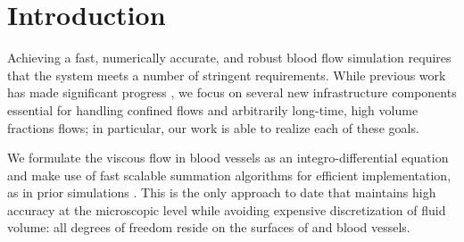 \section{Introduction\label{sec:intro}}
%
%
%

Achieving a fast, numerically accurate, and robust blood flow simulation requires that the system meets a number of stringent requirements.
While previous work has made significant progress \cite{Malhotra2017,lu2018parallel,rahimian2010petascale}, we focus on several new infrastructure components essential for handling confined flows and arbitrarily long-time, high volume fractions \rbc flows; in particular, our work is able to realize each of these goals.

We formulate the viscous flow in blood vessels as an integro-differential equation and make use of fast scalable summation algorithms for efficient implementation, as in prior \rbc simulations \cite{Veerapaneni2011}. 
This is the only approach to date that maintains high accuracy at the microscopic level while avoiding expensive discretization of fluid volume: all degrees of freedom reside on the surfaces of \rbcs and blood vessels.

